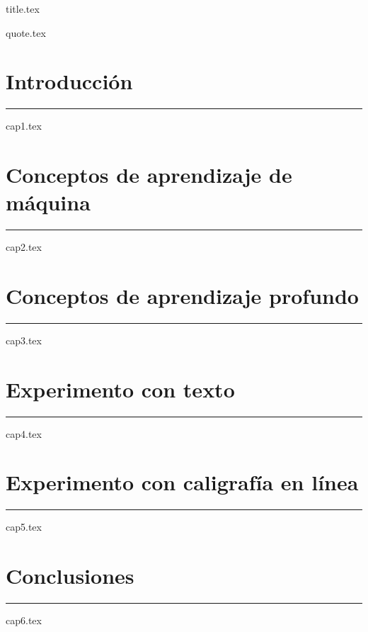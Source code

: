 \documentclass[12 pt]{book}
\numberwithin{equation}{section}
\theoremstyle{plain}
\theoremstyle{definition}
\begin{document}
\frontmatter
{title.tex}

{quote.tex}

\let\cleardoublepage\clearpage
\tableofcontents
\clearpage
\thispagestyle{empty}

\let\cleardoublepage\clearpage

\mainmatter
\ChTitleUpperCase

\chapter{Introducción}
\noindent
\rule{\textwidth}{1pt}
{cap1.tex}
\chapter{Conceptos de aprendizaje de máquina}
\noindent
\rule{\textwidth}{1pt}
{cap2.tex}
\chapter{Conceptos de aprendizaje profundo}
\noindent
\rule{\textwidth}{1pt}
{cap3.tex}
\chapter{Experimento con texto}
\noindent
\rule{\textwidth}{1pt}
{cap4.tex}
\chapter{Experimento con caligrafía en línea}
\noindent
\rule{\textwidth}{1pt}
{cap5.tex}
\chapter{Conclusiones}
\noindent
\rule{\textwidth}{1pt}
{cap6.tex}

\backmatter



\newpage
\end{document}
